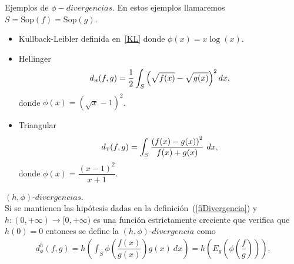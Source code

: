 \begin{example} Ejemplos de $\phi-divergencias$. En estos ejemplos llamaremos $S=\mathrm{Sop}(f)=\mathrm{Sop}(g).$
	\begin{itemize}
		\item Kullback-Leibler definida en~\eqref{KL} donde $\phi(x)=x \log(x)$.
		\item Hellinger
		\begin{align} 
		d_{\text{\tiny{H}}}(f,g)=\dfrac{1}{2} \displaystyle \int_{S} \left(\sqrt{f(x)}-\sqrt{g(x)}\right)^2 dx,
		\end{align}
		donde $\phi(x)=\left(\sqrt{x}-1\right)^2$.
		\item Triangular
		\begin{align}
		\label{triangular}
		d_{\text{\tiny{T}}}(f,g)=\displaystyle \int_{S} \dfrac{\left(f(x)-g(x)\right)^2}{f(x)+g(x)} \ dx,
		\end{align}
		donde $\phi(x)=\dfrac{\left(x-1 \right)^2}{x+1}$.
	\end{itemize}
\end{example}

\begin{definition} $\left(h,\phi\right) \text{-} divergencias$.\\
	\label{hfiDivergencia}
	Si se mantienen las hipótesis dadas en la definición~(\ref{fiDivergencia}) y $h: (0,+\infty)\longrightarrow [0,+\infty)$ es una función estrictamente creciente que verifica que $h(0)=0$ entonces se define la $\left(h,\phi\right) \text{-} divergencia$ como
	\begin{align}
	d^h_{\phi}(f, g)=h\left(\int_{S} \phi\left(\dfrac{f(x)}{g(x)}\right) g(x) \ dx\right)=h\left(E_{g}\left(\phi\left(\dfrac{f}{g}\right)\right)\right).
	\end{align}
\end{definition}

